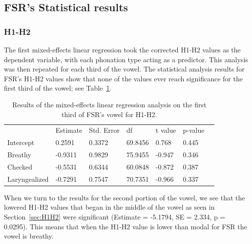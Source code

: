 \documentclass[12pt, letterpaper]{article}
\providecommand{\lsptoprule}{\midrule\toprule}
\providecommand{\lspbottomrule}{\bottomrule\midrule}
\begin{document}
\subsection{FSR's Statistical results} \label{sec:FSRStats}

\subsubsection{H1-H2}

The first mixed-effects linear regression took the corrected H1-H2 values as the dependent variable, with each phonation type acting as a predictor. This analysis was then repeated for each third of the vowel. The statistical analysis results for FSR's H1-H2 values show that none of the values ever reach significance for the first third of the vowel; see Table~\ref{tab:FSR_H1H2_First}. 

\begin{table}[!h]
    \centering
    \caption{Results of the mixed-effects linear regression analysis on the first third of FSR's  vowel for H1-H2. }
    \label{tab:FSR_H1H2_First}
    \begin{tabular}{lllllll}
	\lsptoprule
					&  Estimate  & Std. Error & df & t value & p-value & \\
        Intercept       &  0.2591   & 0.3372 & 69.8456 & 0.768  & 0.445 & \\  
  	Breathy   		&  -0.9311  & 0.9829 & 75.9455 & -0.947  &  0.346 & \\
	Checked    		&  -0.5531  & 0.6344 & 60.0848 & -0.872  & 0.387 & \\
	Laryngealized	&  -0.7291  & 0.7547 & 70.7351 & -0.966  &  0.337 & \\
        \lspbottomrule
    \end{tabular}
\end{table}

When we turn to the results for the second portion of the vowel, we see that the lowered H1-H2 values that began in the middle of the vowel as seen in Section~\ref{sec:H1H2} were significant (Estimate = -5.1794, SE = 2.334, p = 0.0295). This means that when the H1-H2 value is lower than modal for FSR the vowel is breathy. 
\end{document}
